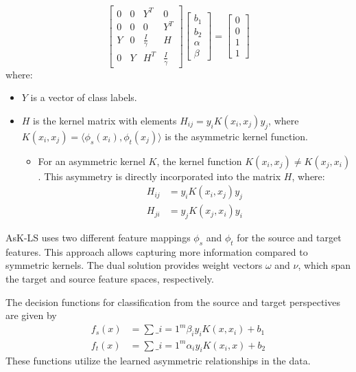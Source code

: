 \[
\begin{bmatrix}
0 & 0 & Y^T & 0 \\
0 & 0 & 0 & Y^T \\
Y & 0 & \frac{I}{\gamma} & H \\
0 & Y & H^T & \frac{I}{\gamma}
\end{bmatrix}
\begin{bmatrix}
b_1 \\
b_2 \\
\alpha \\
\beta
\end{bmatrix}
=
\begin{bmatrix}
0 \\
0 \\
1 \\
1
\end{bmatrix}
\]
where:
\begin{itemize}
	\item \( Y \) is a vector of class labels.
	\item \( H \) is the kernel matrix with elements \( H_{ij} = y_i K(x_i, x_j) y_j \), where \( K(x_i, x_j) = \langle \phi_s(x_i), \phi_t(x_j) \rangle \) is the asymmetric kernel function.
		\begin{itemize}
			\item For an asymmetric kernel \( K \), the kernel function \( K(x_i, x_j) \neq K(x_j, x_i) \). This asymmetry is directly incorporated into the matrix \( H \), where:
				\begin{align*}
					H_{ij} &= y_i K(x_i, x_j) y_j \\
					H_{ji} &= y_j K(x_j, x_i) y_i
				\end{align*}
		\end{itemize}
\end{itemize}

AsK-LS uses two different feature mappings \( \phi_s \) and \( \phi_t \) for the source and target features. This approach allows capturing more information compared to symmetric kernels. The dual solution provides weight vectors \( \omega \) and \( \nu \), which span the target and source feature spaces, respectively.

The decision functions for classification from the source and target perspectives are given by
\begin{align*}
	f_s(x) &= \sum\_{i=1}^m \beta_i y_i K(x, x_i) + b_1\\
	f_t(x) &= \sum\_{i=1}^m \alpha_i y_i K(x_i, x) + b_2
\end{align*}
These functions utilize the learned asymmetric relationships in the data.



